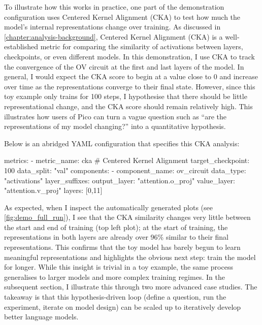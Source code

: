 To illustrate how this works in practice, one part of the demonstration configuration uses Centered Kernel Alignment (CKA) to test how much the model's internal representations change over training. As discussed in \cref{chapter:analysis-background}, Centered Kernel Alignment (CKA) is a well-established metric for comparing the similarity of activations between layers, checkpoints, or even different models. In this demonstration, I use CKA to track the convergence of the OV circuit at the first and last layers of the model. In general, I would expect the CKA score to begin at a value close to 0 and increase over time as the representations converge to their final state. However, since this toy example only trains for 100 steps, I hypothesise that there should be little representational change, and the CKA score should remain relatively high. This illustrates how users of Pico can turn a vague question such as “are the representations of my model changing?” into a quantitative hypothesis.

Below is an abridged YAML configuration that specifies this CKA analysis:

\begin{center}
\begin{configlisting}
    metrics:
    - metric_name: cka # Centered Kernel Alignment
      target_checkpoint: 100
      data_split: "val"
      components: 
        - component_name: ov_circuit
          data_type: "activations"
          layer_suffixes: 
            output_layer: "attention.o_proj"
            value_layer: "attention.v_proj"
          layers: [0,11]

\end{configlisting}
\end{center}

As expected, when I inspect the automatically generated plots (see \cref{fig:demo_full_run}), I see that the CKA similarity changes very little between the start and end of training (top left plot); at the start of training, the representations in both layers are already over 96\% similar to their final representations. This confirms that the toy model has barely begun to learn meaningful representations and highlights the obvious next step: train the model for longer. While this insight is trivial in a toy example, the same process generalises to larger models and more complex training regimes. In the subsequent section, I illustrate this through two more advanced case studies. The takeaway is that this hypothesis-driven loop (define a question, run the experiment, iterate on model design) can be scaled up to iteratively develop better language models.

